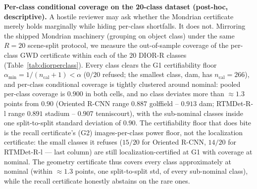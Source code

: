 \documentclass[11pt]{article}
\begin{document}
\textbf{Per-class conditional coverage on the 20-class dataset (post-hoc, descriptive).} A hostile reviewer
may ask whether the Mondrian certificate merely holds marginally while hiding per-class shortfalls. It
does not. Mirroring the shipped Mondrian machinery (grouping on object class) under the same
$R{=}20$ scene-split protocol, we measure the out-of-sample coverage of the per-class GWD certificate
within each of the $20$ DIOR-R classes (Table~\ref{tab:diorperclass}). Every class clears the G1
certifiability floor $\alpha_{\min}{=}1/(n_{\mathrm{cal}}{+}1)\!<\!\alpha$ ($0/20$ refused; the smallest
class, dam, has $n_{\mathrm{cal}}{=}266$), and per-class conditional coverage is tightly clustered around
nominal: pooled per-class coverage is $0.900$ in both cells, and no class deviates more than
$\approx1.3$ points from $0.90$ (Oriented R-CNN range $0.887$ golffield -- $0.913$ dam; RTMDet-R-l range
$0.891$ stadium -- $0.907$ tenniscourt), with the sub-nominal classes inside one split-to-split standard
deviation of $0.90$. The certifiability floor that does bite is the recall certificate's (G2)
images-per-class power floor, not the localization certificate: the small classes it refuses ($15/20$ for
Oriented R-CNN, $14/20$ for RTMDet-R-l --- last column) are still localization-certified at G1 with coverage
at nominal. The geometry certificate thus covers every class approximately at nominal (within
$\approx1.3$ points, one split-to-split std, of every sub-nominal class), while the recall certificate
honestly abstains on the rare ones.
\end{document}
